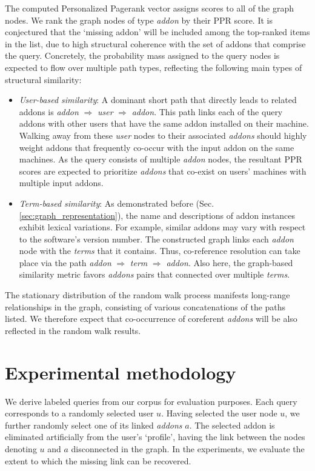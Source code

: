\documentclass[11pt,oneside]{book}
\let\Oldsection\section
\renewcommand{\section}{\FloatBarrier\Oldsection}
\begin{document}
The computed Personalized Pagerank vector assigns scores to all of the
graph nodes. We rank the graph nodes of type {\it addon} by their PPR score. It is conjectured that the `missing addon' will be included among the top-ranked items in the list, due to high structural coherence with the set of addons that comprise the query. Concretely, the probability mass assigned to the query nodes is expected to flow over multiple path types, reflecting the following main types of structural similarity:
\begin{itemize}
\item {\it User-based similarity}: A dominant short path that
  directly leads to related addons is {\it addon} $\Rightarrow$ {\it user}
   $\Rightarrow$ {\it addon}. This path links each of the query addons
  with other users that have the same addon installed on their
  machine. Walking away from these {\it user} nodes to their associated
  {\it addons} should highly weight addons that frequently
  co-occur with the input addon on the same machines. As the query consists of multiple {\it addon} nodes, the resultant PPR scores are expected to prioritize {\it addons} that co-exist on users' machines with multiple input addons.   
\item {\it Term-based similarity}: As demonstrated before
  (Sec. \autoref{sec:graph_representation}), the name and descriptions of addon
  instances exhibit lexical variations. For example, similar addons may vary with respect to the software's version number. The constructed graph links each {\it addon} node with the {\it terms} that it contains. Thus, co-reference resolution can take place via the path {\it addon}
  $\Rightarrow$ {\it term} $\Rightarrow$ {\it addon}. Also here, the graph-based similarity metric favors {\it addons} pairs that connected over multiple {\it terms}. 
\end{itemize}

The stationary distribution of the random walk process manifests long-range relationships in the graph, consisting of various concatenations of the paths listed. We therefore expect that co-occurrence of coreferent {\it addons} will be also reflected in the random walk results.


\section{Experimental methodology}

We derive labeled queries from our corpus for evaluation purposes.  Each query corresponds to a randomly selected user $u$. Having selected the user node $u$, we further randomly select one of its linked {\it addons} $a$. The selected addon is eliminated artificially from the user's `profile', having the link between the nodes denoting $u$ and $a$ disconnected in the graph. In
the experiments, we evaluate the extent to which the missing link can
be recovered. 
\end{document}
